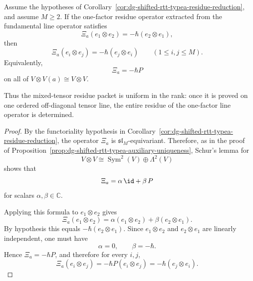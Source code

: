 \begin{proposition}
\label{prop:dg-shifted-rtt-typea-uniform-single-line}
Assume the hypotheses of
Corollary~\ref{cor:dg-shifted-rtt-typea-residue-reduction}, and assume
$M\ge2$. If the one-factor residue operator extracted from the
fundamental line operator satisfies
\[
\Xi_a(e_1\otimes e_2)=-\hbar(e_2\otimes e_1),
\]
then
\[
\Xi_a(e_i\otimes e_j)=-\hbar(e_j\otimes e_i)
\qquad (1\le i,j\le M).
\]
Equivalently,
\[
\Xi_a=-\hbar P
\]
on all of $V\otimes V(a)\cong V\otimes V$.

Thus the mixed-tensor residue packet is uniform in the rank: once it is
proved on one ordered off-diagonal tensor line, the entire residue of
the one-factor line operator is determined.
\end{proposition}

\begin{proof}
By the functoriality hypothesis in
Corollary~\ref{cor:dg-shifted-rtt-typea-residue-reduction}, the
operator $\Xi_a$ is $\mathfrak{sl}_M$-equivariant. Therefore, as in the
proof of
Proposition~\ref{prop:dg-shifted-rtt-typea-auxiliary-uniqueness},
Schur's lemma for
\[
V\otimes V\cong \operatorname{Sym}^2(V)\oplus \Lambda^2(V)
\]
shows that
\[
\Xi_a=\alpha\,\id+\beta\,P
\]
for scalars $\alpha,\beta\in\mathbb{C}$.

Applying this formula to $e_1\otimes e_2$ gives
\[
\Xi_a(e_1\otimes e_2)
=
\alpha(e_1\otimes e_2)+\beta(e_2\otimes e_1).
\]
By hypothesis this equals $-\hbar(e_2\otimes e_1)$. Since
$e_1\otimes e_2$ and $e_2\otimes e_1$ are linearly independent, one
must have
\[
\alpha=0,\qquad \beta=-\hbar.
\]
Hence $\Xi_a=-\hbar P$, and therefore for every $i,j$,
\[
\Xi_a(e_i\otimes e_j)=-\hbar P(e_i\otimes e_j)
=-\hbar(e_j\otimes e_i).
\]
\end{proof}

